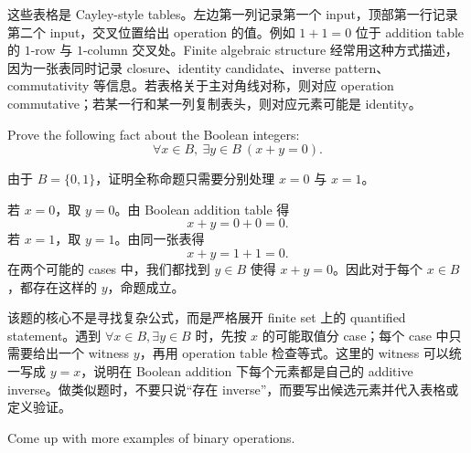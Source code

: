 这些表格是 Cayley-style tables。左边第一列记录第一个 input，顶部第一行记录第二个 input，交叉位置给出 operation 的值。例如 \(1+1=0\) 位于 addition table 的 \(1\)-row 与 \(1\)-column 交叉处。Finite algebraic structure 经常用这种方式描述，因为一张表同时记录 closure、identity candidate、inverse pattern、commutativity 等信息。若表格关于主对角线对称，则对应 operation commutative；若某一行和某一列复制表头，则对应元素可能是 identity。

\begin{exerciseblock}
Prove the following fact about the Boolean integers:
\[
  \forall x\in B,\ \exists y\in B\ (x+y=0).
\]
\end{exerciseblock}

\begin{solution}
由于 \(B=\{0,1\}\)，证明全称命题只需要分别处理 \(x=0\) 与 \(x=1\)。

若 \(x=0\)，取 \(y=0\)。由 Boolean addition table 得
\[
  x+y=0+0=0.
\]
若 \(x=1\)，取 \(y=1\)。由同一张表得
\[
  x+y=1+1=0.
\]
在两个可能的 cases 中，我们都找到 \(y\in B\) 使得 \(x+y=0\)。因此对于每个 \(x\in B\)，都存在这样的 \(y\)，命题成立。
\end{solution}

\begin{explanation}
该题的核心不是寻找复杂公式，而是严格展开 finite set 上的 quantified statement。遇到
\(\forall x\in B,\exists y\in B\) 时，先按 \(x\) 的可能取值分 case；每个 case 中只需要给出一个 witness \(y\)，再用 operation table 检查等式。这里的 witness 可以统一写成 \(y=x\)，说明在 Boolean addition 下每个元素都是自己的 additive inverse。做类似题时，不要只说“存在 inverse”，而要写出候选元素并代入表格或定义验证。
\end{explanation}

\begin{exerciseblock}
Come up with more examples of binary operations.
\end{exerciseblock}

